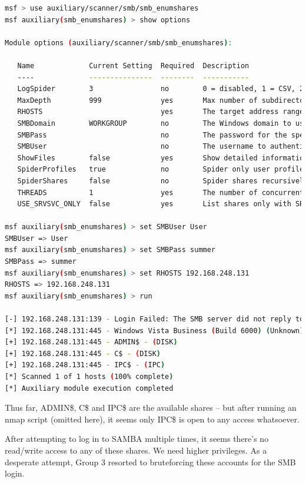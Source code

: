 \begin{lstlisting}[language=bash,caption={Enumerating shares}]
msf > use auxiliary/scanner/smb/smb_enumshares
msf auxiliary(smb_enumshares) > show options

Module options (auxiliary/scanner/smb/smb_enumshares):

   Name             Current Setting  Required  Description
   ----             ---------------  --------  -----------
   LogSpider        3                no        0 = disabled, 1 = CSV, 2 = table (txt), 3 = one liner (txt) (accepted: 0, 1, 2, 3)
   MaxDepth         999              yes       Max number of subdirectories to spider
   RHOSTS                            yes       The target address range or CIDR identifier
   SMBDomain        WORKGROUP        no        The Windows domain to use for authentication
   SMBPass                           no        The password for the specified username
   SMBUser                           no        The username to authenticate as
   ShowFiles        false            yes       Show detailed information when spidering
   SpiderProfiles   true             no        Spider only user profiles when share = C$
   SpiderShares     false            no        Spider shares recursively
   THREADS          1                yes       The number of concurrent threads
   USE_SRVSVC_ONLY  false            yes       List shares only with SRVSVC

msf auxiliary(smb_enumshares) > set SMBUser User
SMBUser => User
msf auxiliary(smb_enumshares) > set SMBPass summer
SMBPass => summer
msf auxiliary(smb_enumshares) > set RHOSTS 192.168.248.131
RHOSTS => 192.168.248.131
msf auxiliary(smb_enumshares) > run

[-] 192.168.248.131:139 - Login Failed: The SMB server did not reply to our request
[*] 192.168.248.131:445 - Windows Vista Business (Build 6000) (Unknown)
[+] 192.168.248.131:445 - ADMIN$ - (DISK) 
[+] 192.168.248.131:445 - C$ - (DISK) 
[+] 192.168.248.131:445 - IPC$ - (IPC) 
[*] Scanned 1 of 1 hosts (100% complete)
[*] Auxiliary module execution completed
\end{lstlisting}

Thus far, ADMIN\$, C\$ and IPC\$ are the available shares -- but after running an nmap script (omitted here), it seems only IPC\$ is open to any access whatsoever.

After attempting to log in to SAMBA multiple times, it seems there's no read/write access to any of these shares. We need higher privileges. As a desperate attempt, Group 3 resorted to bruteforcing these accounts for the SMB login.

